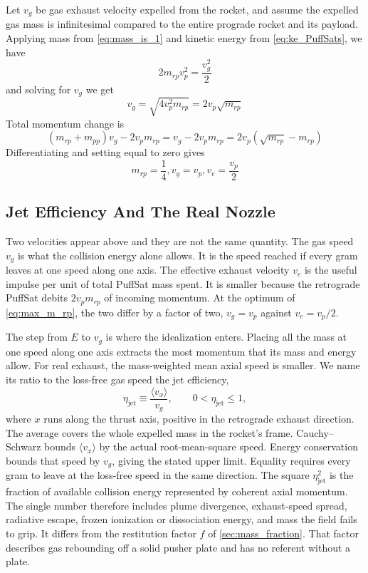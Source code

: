 \documentclass{article}
\begin{document}
Let $v_g$ be gas exhaust velocity expelled from the rocket, and assume the expelled gas mass is infinitesimal compared to the entire prograde rocket and its payload. Applying mass from \autoref{eq:mass_is_1}
 and kinetic energy from \autoref{eq:ke_PuffSats}, we have 
 \begin{equation}
 2m_{rp}v_p^2= \frac{v_g^2}{2}
 \end{equation}
 and solving for $v_g$ we get 
 \begin{equation}
 v_g = \sqrt{4v_p^2m_{rp}} = 2v_p\sqrt{m_{rp}} \label{eq:vg_result}
 \end{equation}
 Total momentum change is 
 \[(m_{rp} + m_{pp})v_g - 2v_pm_{rp} = v_g-2v_pm_{rp} = 2v_p(\sqrt{m_{rp}} - m_{rp}) \]
Differentiating and setting equal to zero gives
 \begin{equation}
 m_{rp} = \frac{1}{4}, \label{eq:max_m_rp}
 v_g = v_p,
 v_e= \frac{v_p}{2}
 \end{equation}

\subsection{Jet Efficiency And The Real Nozzle}\label{sec:jet_efficiency}
Two velocities appear above and they are not the same quantity. The gas speed $v_g$ is what the collision energy alone allows. It is the speed reached if every gram leaves at one speed along one axis. The effective exhaust velocity $v_e$ is the useful impulse per unit of total PuffSat mass spent. It is smaller because the retrograde PuffSat debits $2v_pm_{rp}$ of incoming momentum. At the optimum of \autoref{eq:max_m_rp}, the two differ by a factor of two, $v_g = v_p$ against $v_e = v_p/2$.

The step from $E$ to $v_g$ is where the idealization enters. Placing all the mass at one speed along one axis extracts the most momentum that its mass and energy allow. For real exhaust, the mass-weighted mean axial speed is smaller. We name its ratio to the loss-free gas speed the jet efficiency,
\begin{equation}
\eta_{\mathrm{jet}} \equiv \frac{\langle v_x \rangle}{v_g}, \qquad 0 < \eta_{\mathrm{jet}} \le 1,
\label{eq:eta_jet_def}
\end{equation}
where $x$ runs along the thrust axis, positive in the retrograde exhaust direction. The average covers the whole expelled mass in the rocket's frame. Cauchy--Schwarz bounds $\langle v_x\rangle$ by the actual root-mean-square speed. Energy conservation bounds that speed by $v_g$, giving the stated upper limit. Equality requires every gram to leave at the loss-free speed in the same direction. The square $\eta_{\mathrm{jet}}^2$ is the fraction of available collision energy represented by coherent axial momentum. The single number therefore includes plume divergence, exhaust-speed spread, radiative escape, frozen ionization or dissociation energy, and mass the field fails to grip. It differs from the restitution factor $f$ of \autoref{sec:mass_fraction}. That factor describes gas rebounding off a solid pusher plate and has no referent without a plate.
\end{document}
